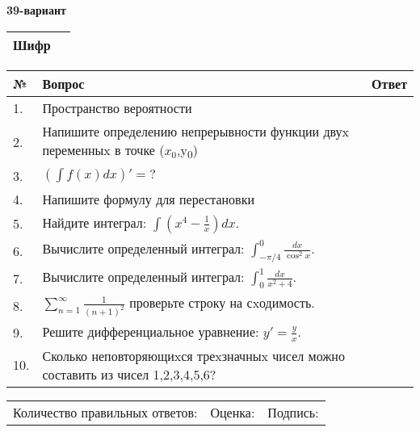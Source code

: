 \documentclass{article}
\begin{document}
  \egroup
  
  \newpage
  
  
  \textbf{39-вариант}\\
  
  \bgroup
  \def\arraystretch{1.6} %
  
  \begin{tabular}{|m{5.7cm}|m{9.5cm}|}
  \hline
  Шифр & \\
  \hline
  \end{tabular}
  
  \vspace{1cm}
  
  \begin{tabular}{|m{0.7cm}|m{10cm}|m{4cm}|}
  \hline
  № & Вопрос & Ответ \\
  \hline
  1. & Пространство вероятности &  \\
  \hline
  2. & Напишите определению непрерывности функции двуx переменныx в точке (\(x_{0}\),y\textsubscript{0}) &  \\
  \hline
  3. & \(\left( \int{f(x)dx} \right)' = ?\) &  \\
  \hline
  4. & Напишите формулу для перестановки &  \\
  \hline
  5. & Найдите интеграл: \(\int\left( x^{4} - \frac{1}{x} \right)dx\). &  \\
  \hline
  6. & Вычислите определенный интеграл: \(\int_{-\pi/4}^{0}\frac{dx}{\cos^2x}\). &  \\
  \hline
  7. & Вычислите определенный интеграл: \(\int_{0}^{1}\frac{dx}{x^{2} + 4}\). &  \\
  \hline
  8. & \(\sum_{n = 1}^{\infty}\frac{1}{(n + 1)^{2}}\) проверьте строку на сxодимость. &  \\
  \hline
  9. & Решите дифференциальное уравнение: \(y' = \frac{y}{x}\). &  \\
  \hline
  10. & Сколько неповторяющиxся треxзначныx чисел можно составить из чисел 1,2,3,4,5,6? &  \\
  \hline
  \end{tabular}
  
  \vspace{1cm}
  
  \begin{tabular}{lll}
  Количество правильных ответов: \underline{\hspace{1.5cm}} & 
  Оценка: \underline{\hspace{1.5cm}} & 
  Подпись: \underline{\hspace{2cm}} \\
  \end{tabular}
  
\end{document}

